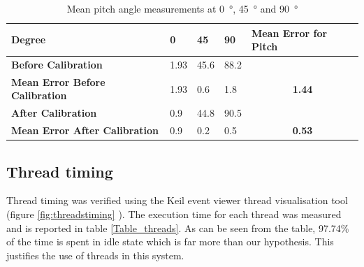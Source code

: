 \documentclass[12pt]{article}
\begin{document}
\begin{table}[!h]
\centering
\caption{Mean pitch angle measurements at \SI{0}{\degree}, \SI{45}{\degree} and \SI{90}{\degree}}
\label{Table_acc_pitch}
\begin{tabular}{lllll}
\hline
\textbf{Degree}                                                                                                                                                                                                             & \textbf{0} & \textbf{45} & \textbf{90} & \textbf{Mean Error for Pitch}
\\ \hline
\textbf{Before Calibration}                                                                                                                                                                                                         & 1.93 & 45.6 & 88.2
\\ \hline
\textbf{Mean Error Before Calibration}                                                                                                                                                                                                             & 1.93 & 0.6 & 1.8 & \multicolumn{1}{c}{\textbf{1.44}}
\\ \hline
\textbf{After	 Calibration}                                                                                                                                                                                                              & 0.9 & 44.8 & 90.5
\\ \hline
\textbf{Mean Error After Calibration}                                                                                                                                                                                                             & 0.9 & 0.2 & 0.5 & \multicolumn{1}{c}{\textbf{0.53}}
\end{tabular}
\end{table}

\subsection{Thread timing}
Thread timing was verified using the Keil event viewer thread visualisation tool (figure \ref{fig:threadstiming}  ). The execution time for each thread was measured and is reported in table \ref{Table_threads}. As can be seen from the table, 97.74\% of the time is spent in idle state which is far more than our hypothesis. This justifies the use of threads in this system.
\end{document}
